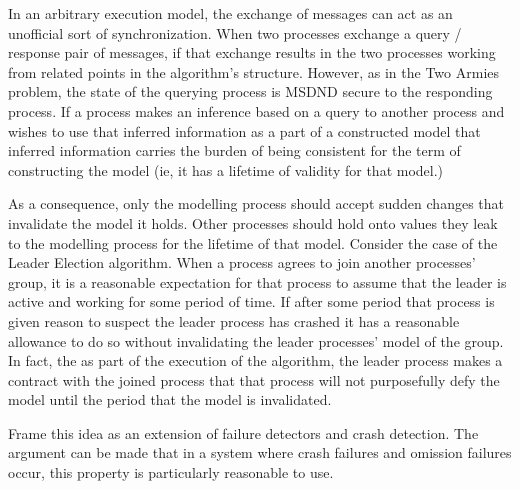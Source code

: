 \documentclass[12pt,oneside]{article}
\begin{document}
In an arbitrary execution model, the exchange of messages can act as an unofficial sort of synchronization. When two processes exchange a query / response pair of messages, if that exchange results in the two processes working from related points in the algorithm's structure. However, as in the Two Armies problem, the state of the querying process is MSDND secure to the responding process. If a process makes an inference based on a query to another process and wishes to use that inferred information as a part of a constructed model that inferred information carries the burden of being consistent for the term of constructing the model (ie, it has a lifetime of validity for that model.)

As a consequence, only the modelling process should accept sudden changes that invalidate the model it holds. Other processes should hold onto values they leak to the modelling process for the lifetime of that model. Consider the case of the Leader Election algorithm. When a process agrees to join another processes' group, it is a reasonable expectation for that process to assume that the leader is active and working for some period of time. If after some period that process is given reason to suspect the leader process has crashed it has a reasonable allowance to do so without invalidating the leader processes' model of the group. In fact, the as part of the execution of the algorithm, the leader process makes a contract with the joined process that that process will not purposefully defy the model until the period that the model is invalidated.

Frame this idea as an extension of failure detectors and crash detection. The argument can be made that in a system where crash failures and omission failures occur, this property is particularly reasonable to use.








\end{document}

